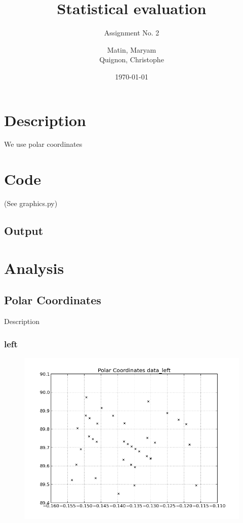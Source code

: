 \documentclass{scrartcl}
\begin{document}
\title{Statistical evaluation}
\subtitle{Assignment No. 2}
\author{
  Matin, Maryam \\
  Quignon, Christophe
} 
\date{\today}


\maketitle

\section{Description}
We use polar coordinates

\section{Code}
(See graphics.py)


\subsection{Output}


\section{Analysis}


\subsection{Polar Coordinates}

Description

\subsubsection{left}
\begin{figure}[H]
  \centering
  \includegraphics[width=0.5\linewidth]{img/data_left_pc.png}
\end{figure}
\end{document}
